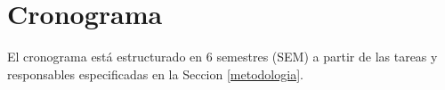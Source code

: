 \section{Cronograma}
\label{cronograma}

El cronograma est\'a estructurado en 6 semestres (SEM) a partir de las tareas y
responsables especificadas en la Seccion \ref{metodologia}.  



